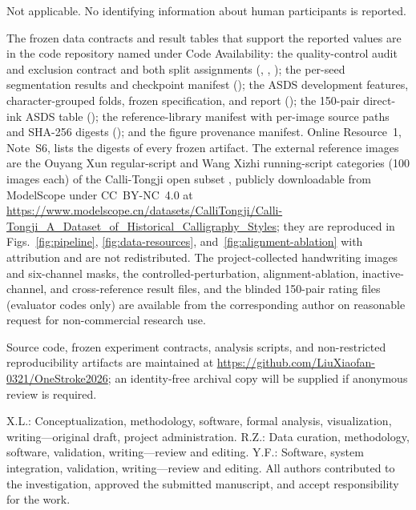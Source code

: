 \documentclass[iicol,pdflatex,sn-basic,Numbered]{sn-jnl}
\begin{document}
Not applicable. No identifying information about human participants is
reported.

The frozen data contracts and result tables that support the reported values
are in the code repository named under Code Availability: the quality-control
audit and exclusion contract and both split assignments
(, ,
); the per-seed
segmentation results and checkpoint manifest
(); the ASDS development features,
character-grouped folds, frozen specification, and report
(); the 150-pair
direct-ink ASDS table ();
the reference-library manifest with per-image source paths and SHA-256
digests (); and the
figure provenance manifest. Online Resource~1, Note~S6, lists the digests of
every frozen artifact. The external reference images are the Ouyang Xun
regular-script and Wang Xizhi running-script categories (100 images each) of
the Calli-Tongji open subset \cite{yunmo_jixin_2025}, publicly downloadable
from ModelScope under CC~BY-NC~4.0 at
\url{https://www.modelscope.cn/datasets/CalliTongji/Calli-Tongji_A_Dataset_of_Historical_Calligraphy_Styles};
they are reproduced in Figs.~\ref{fig:pipeline}, \ref{fig:data-resources},
and~\ref{fig:alignment-ablation} with attribution and are not redistributed.
The project-collected handwriting images and six-channel masks, the
controlled-perturbation, alignment-ablation, inactive-channel, and
cross-reference result files, and the blinded 150-pair rating files
(evaluator codes only) are available from the corresponding author on
reasonable request for non-commercial research use.

Source code, frozen experiment contracts, analysis scripts, and
non-restricted reproducibility artifacts are maintained at
\url{https://github.com/LiuXiaofan-0321/OneStroke2026}; an identity-free
archival copy will be supplied if anonymous review is required.

X.L.: Conceptualization, methodology, software, formal analysis,
visualization, writing---original draft, project administration. R.Z.: Data
curation, methodology, software, validation, writing---review and editing.
Y.F.: Software, system integration, validation, writing---review and editing.
All authors contributed to the investigation, approved the submitted
manuscript, and accept responsibility for the work.


\end{document}
